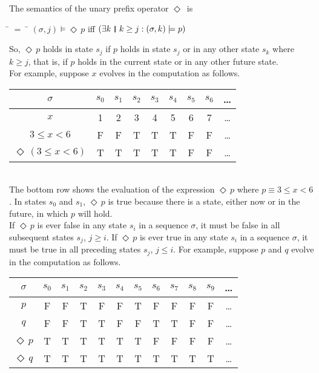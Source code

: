 \documentclass[fleqn, leqno]{article}
\newcommand{\mymathindent}{24pt}                    %
\newcommand{\Event}{\Diamond\,}
\newcommand{\thedr}{\rule[-.25ex]{.32mm}{1.75ex}}   %
\newcommand{\dr}{\;\,\thedr\,\;}                    %
\newcommand{\rb}{:}                                 %
\newcommand{\ext}{\exists}                          %
\begin{document}
The semantics of the unary prefix operator $\Event$ is

\begin{tabbing}
\hspace{\mymathindent} \= $= \;$ \= \kill
  \> $(\sigma, j) \models \Event p$ \quad iff \quad $(\ext k \dr k \ge j \rb (\sigma,k) \models p)$
\end{tabbing}

So, $\Event p$ holds in state $s_j$ if $p$ holds in state $s_j$ or in any other state $s_k$ where $k\ge j$,
that is, if $p$ holds in the current state or in any other future state.\\

For example, suppose $x$ evolves in the computation as follows.\\

\begin{tabular}{c|cccccccc}
  $\sigma$                  & $s_0$ & $s_1$ & $s_2$ & $s_3$ & $s_4$ & $s_5$ & $s_6$ & \dots \\
  \hline
  $x$                       & 1     & 2     & 3     & 4     & 5     & 6     & 7     &  \dots\\
  $3\le x<6$                & F     & F     & T     & T     & T     & F     & F     &  \dots\\
  $\Event(3\le x<6)$        & T     & T     & T     & T     & T     & F     & F     &  \dots\\
\end{tabular}\\

The bottom row shows the evaluation of the expression $\Event p$ where $p\equiv 3\le x<6$.
In states $s_0$ and $s_1$, $\Event p$ is true because there is a state, either now or in the future, in which $p$ will hold.\\

If $\Event p$ is ever false in any state $s_i$ in a sequence $\sigma$, it must be false in all subsequent states $s_j$, $j\ge i$.
If $\Event p$ is ever true in any state $s_i$ in a sequence $\sigma$, it must be true in all preceding states $s_j$, $j\le i$.
For example, suppose $p$ and $q$ evolve in the computation as follows.\\

\begin{tabular}{c|ccccccccccc}
  $\sigma$       & $s_0$ & $s_1$ & $s_2$ & $s_3$ & $s_4$ & $s_5$ & $s_6$ & $s_7$ & $s_8$& $s_9$  & \dots \\
  \hline
  $p$            & F     & F     & T     & F     & F     & T     & F     & F     & F     & F     &  \dots\\
  $q$            & F     & F     & T     & T     & F     & F     & T     & T     & F     & F     &  \dots\\
  $\Event p$     & T     & T     & T     & T     & T     & T     & F     & F     & F     & F     &  \dots\\
  $\Event q$     & T     & T     & T     & T     & T     & T     & T     & T     & T     & T     &  \dots\\
\end{tabular}\\
\end{document}
